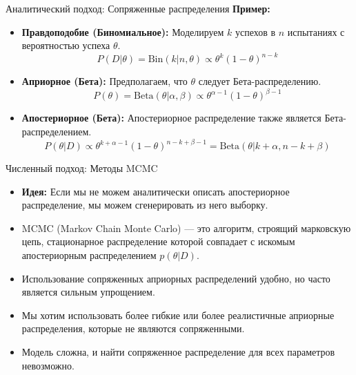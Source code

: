 \documentclass[notheorems, handout]{beamer}
\begin{document}
\begin{frame}{Аналитический подход: Сопряженные распределения}
  \textbf{Пример:}
  \begin{itemize}
    \item \textbf{Правдоподобие (Биномиальное):} Моделируем $k$
      успехов в $n$ испытаниях с вероятностью успеха $\theta$.
      \begin{equation*}
        P(D|\theta) = \text{Bin}(k|n, \theta) \propto \theta^k (1-\theta)^{n-k}
      \end{equation*}
    \item \textbf{Априорное (Бета):} Предполагаем, что $\theta$
      следует Бета-распределению.
      \begin{equation*}
        P(\theta) = \text{Beta}(\theta|\alpha, \beta) \propto
        \theta^{\alpha-1} (1-\theta)^{\beta-1}
      \end{equation*}
    \item \textbf{Апостериорное (Бета):} Апостериорное распределение
      также является Бета-распределением.
      \begin{equation*}
        P(\theta|D) \propto \theta^{k+\alpha-1}
        (1-\theta)^{n-k+\beta-1} = \text{Beta}(\theta|k+\alpha, n-k+\beta)
      \end{equation*}
  \end{itemize}
\end{frame}
\begin{frame}{Численный подход: Методы MCMC}
  \begin{itemize}
    \item \textbf{Идея:} Если мы не можем аналитически описать
      апостериорное распределение, мы можем сгенерировать из него выборку.
    \item MCMC (Markov Chain Monte Carlo) --- это алгоритм, строящий
      марковскую цепь, стационарное распределение которой совпадает с
      искомым апостериорным распределением $p(\theta|D)$.
    \item Использование сопряженных априорных распределений удобно,
      но часто является сильным упрощением.
    \item Мы хотим использовать более гибкие или более реалистичные
      априорные распределения, которые не являются сопряженными.
    \item Модель сложна, и найти сопряженное распределение для всех
      параметров невозможно.
  \end{itemize}
  \vspace{0.5cm}
\end{frame}
\end{document}
